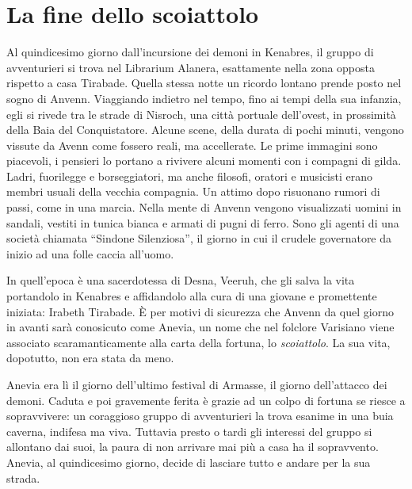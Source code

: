 \chapter{La fine dello scoiattolo}
\label{chp:cap3}

Al quindicesimo giorno dall'incursione dei demoni in Kenabres, il gruppo di avventurieri si trova nel Librarium Alanera, esattamente nella zona opposta rispetto a casa Tirabade. Quella stessa notte un ricordo lontano prende posto nel sogno di Anvenn. Viaggiando indietro nel tempo, fino ai tempi della sua infanzia, egli si rivede tra le strade di Nisroch, una citt\`a portuale dell'ovest, in prossimit\`a della Baia del Conquistatore. Alcune scene, della durata di pochi minuti, vengono vissute da Avenn come fossero reali, ma accellerate. Le prime immagini sono piacevoli, i pensieri lo portano a rivivere alcuni momenti con i compagni di gilda. Ladri, fuorilegge e borseggiatori, ma anche filosofi, oratori e musicisti erano membri usuali della vecchia compagnia. Un attimo dopo risuonano rumori di passi, come in una marcia. Nella mente di Anvenn vengono visualizzati uomini in sandali, vestiti in tunica bianca e armati di pugni di ferro. Sono gli agenti di una societ\`a chiamata ``Sindone Silenziosa'', il giorno in cui il crudele governatore da inizio ad una folle caccia all'uomo.

In quell'epoca \`e una sacerdotessa di Desna, Veeruh, che gli salva la vita portandolo in Kenabres e affidandolo alla cura di una giovane e promettente iniziata: Irabeth Tirabade. \`E per motivi di sicurezza che Anvenn da quel giorno in avanti sar\`a conosicuto come Anevia, un nome che nel folclore Varisiano viene associato scaramanticamente alla carta della fortuna, lo \emph{scoiattolo}. La sua vita, dopotutto, non era stata da meno.

Anevia era l\`i il giorno dell'ultimo festival di Armasse, il giorno dell'attacco dei demoni. Caduta e poi gravemente ferita \`e grazie ad un colpo di fortuna se riesce a sopravvivere: un coraggioso gruppo di avventurieri la trova esanime in una buia caverna, indifesa ma viva. Tuttavia presto o tardi gli interessi del gruppo si allontano dai suoi, la paura di non arrivare mai pi\`u a casa ha il sopravvento. Anevia, al quindicesimo giorno, decide di lasciare tutto e andare per la sua strada.

